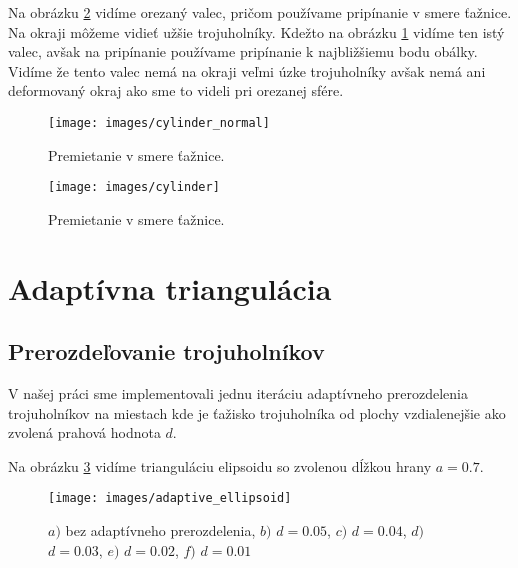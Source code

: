 Na obrázku \ref{obr:cylinder} vidíme orezaný valec, pričom používame
pripínanie v smere ťažnice. Na okraji môžeme vidieť užšie trojuholníky. 
Kdežto na obrázku \ref{obr:cylinder_normal} vidíme ten istý valec, 
avšak na pripínanie používame pripínanie k najbližšiemu bodu obálky.
Vidíme že tento valec nemá na okraji veľmi úzke trojuholníky avšak 
nemá ani deformovaný okraj ako sme to videli pri orezanej sfére.

\begin{figure}
    \centerline{\texttt{[image: images/cylinder\_normal]}}
    \caption[Ohraničená triangulácia tetrahedronu -- premietanie na najbližší bod]
    {Premietanie v smere ťažnice.}
    \label{obr:cylinder_normal}
\end{figure}

\begin{figure}
    \centerline{\texttt{[image: images/cylinder]}}
    \caption[Ohraničená triangulácia tetrahedronu -- premietanie v smere ťažnice]
    {Premietanie v smere ťažnice.}
    \label{obr:cylinder}
\end{figure}

\section{Adaptívna triangulácia}
\subsection{Prerozdeľovanie trojuholníkov}

V našej práci sme implementovali jednu iteráciu adaptívneho prerozdelenia trojuholníkov
na miestach kde je ťažisko trojuholníka od plochy vzdialenejšie ako zvolená prahová hodnota $d$.

Na obrázku \ref{obr:adaptive_ellipsoid} vidíme trianguláciu elipsoidu so zvolenou dĺžkou hrany $a=0.7$.

\begin{figure}
    \centerline{\texttt{[image: images/adaptive\_ellipsoid]}}
    \caption[Adaptívne prerozdelenie elipsoidu.]
    {$a)$ bez adaptívneho prerozdelenia, $b)$ $d=0.05$, $c)$ $d=0.04$, $d)$ $d=0.03$, $e)$ $d=0.02$, $f)$ $d=0.01$}
    \label{obr:adaptive_ellipsoid}
\end{figure}


